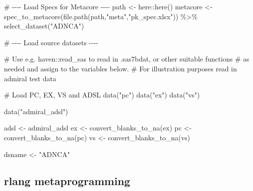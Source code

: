 \documentclass[
  letterpaper,
  DIV=11,
  numbers=noendperiod]{scrreprt}
\newenvironment{Shaded}{\begin{snugshade}}{\end{snugshade}}
\newcommand{\CommentTok}[1]{\textcolor[rgb]{0.37,0.37,0.37}{#1}}
\newcommand{\FunctionTok}[1]{\textcolor[rgb]{0.28,0.35,0.67}{#1}}
\newcommand{\NormalTok}[1]{\textcolor[rgb]{0.00,0.23,0.31}{#1}}
\newcommand{\OtherTok}[1]{\textcolor[rgb]{0.00,0.23,0.31}{#1}}
\newcommand{\SpecialCharTok}[1]{\textcolor[rgb]{0.37,0.37,0.37}{#1}}
\newcommand{\StringTok}[1]{\textcolor[rgb]{0.13,0.47,0.30}{#1}}
\begin{document}
\begin{Shaded}
\begin{Highlighting}[]
\CommentTok{\# {-}{-}{-}{-} Load Specs for Metacore {-}{-}{-}{-}}
\NormalTok{path }\OtherTok{\textless{}{-}}\NormalTok{ here}\SpecialCharTok{::}\FunctionTok{here}\NormalTok{()}
\NormalTok{metacore }\OtherTok{\textless{}{-}} \FunctionTok{spec\_to\_metacore}\NormalTok{(}\FunctionTok{file.path}\NormalTok{(path,}\StringTok{"meta"}\NormalTok{,}\StringTok{"pk\_spec.xlsx"}\NormalTok{)) }\SpecialCharTok{\%\textgreater{}\%}
  \FunctionTok{select\_dataset}\NormalTok{(}\StringTok{"ADNCA"}\NormalTok{)}

\CommentTok{\# {-}{-}{-}{-} Load source datasets {-}{-}{-}{-}}

\CommentTok{\# Use e.g. haven::read\_sas to read in .sas7bdat, or other suitable functions}
\CommentTok{\# as needed and assign to the variables below.}
\CommentTok{\# For illustration purposes read in admiral test data}

\CommentTok{\# Load PC, EX, VS and ADSL}
\FunctionTok{data}\NormalTok{(}\StringTok{"pc"}\NormalTok{)}
\FunctionTok{data}\NormalTok{(}\StringTok{"ex"}\NormalTok{)}
\FunctionTok{data}\NormalTok{(}\StringTok{"vs"}\NormalTok{)}

\FunctionTok{data}\NormalTok{(}\StringTok{"admiral\_adsl"}\NormalTok{)}

\NormalTok{adsl }\OtherTok{\textless{}{-}}\NormalTok{ admiral\_adsl}
\NormalTok{ex   }\OtherTok{\textless{}{-}} \FunctionTok{convert\_blanks\_to\_na}\NormalTok{(ex)}
\NormalTok{pc   }\OtherTok{\textless{}{-}} \FunctionTok{convert\_blanks\_to\_na}\NormalTok{(pc)}
\NormalTok{vs   }\OtherTok{\textless{}{-}} \FunctionTok{convert\_blanks\_to\_na}\NormalTok{(vs)}

\NormalTok{dsname }\OtherTok{\textless{}{-}} \StringTok{"ADNCA"}
\end{Highlighting}
\end{Shaded}

\hypertarget{rlang-metaprogramming}{%
\subsection{rlang metaprogramming}\label{rlang-metaprogramming}}
\end{document}
